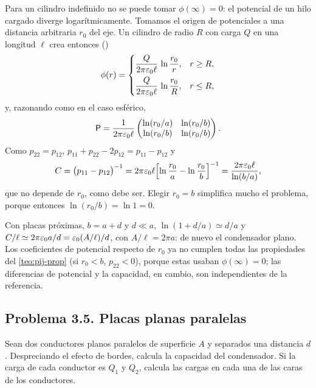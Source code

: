\begin{resolucion}
 Para un cilindro indefinido no se puede tomar $\phi(\infty)=0$: el potencial de un hilo cargado diverge
logarítmicamente. Tomamos el origen de potenciales a una distancia arbitraria $r_0$ del eje. Un cilindro de radio $R$ con carga $Q$ en una longitud $\ell$
crea entonces ()
\[
  \phi(r)=\begin{cases}\dfrac{Q}{2\pi\varepsilon_{0}\ell}\,\ln\dfrac{r_0}{r}, & r\ge R,\\[8pt] \dfrac{Q}{2\pi\varepsilon_{0}\ell}\,\ln\dfrac{r_0}{R}, & r\le R,\end{cases}
\]
y, razonando como en el caso esférico,
\[
  \mathsf{P}=\frac{1}{2\pi\varepsilon_{0}\ell}\begin{pmatrix}\ln(r_0/a) & \ln(r_0/b)\\ \ln(r_0/b) & \ln(r_0/b)\end{pmatrix}.
\]
Como $p_{22}=p_{12}$, $p_{11}+p_{22}-2p_{12}=p_{11}-p_{12}$ y
\[
  C=\bigl(p_{11}-p_{12}\bigr)^{-1}=2\pi\varepsilon_{0}\ell\Bigl[\ln\frac{r_0}{a}-\ln\frac{r_0}{b}\Bigr]^{-1}=\frac{2\pi\varepsilon_{0}\ell}{\ln(b/a)} ,
\]
que no depende de $r_0$, como debe ser. Elegir $r_0=b$ simplifica mucho el problema, porque entonces $\ln(r_0/b)=\ln1=0$.
\end{resolucion}



\begin{observacion}[Interpretación]\label{obs:sem-cilindrico}
Con placas próximas, $b=a+d$ y $d\ll a$, $\ln(1+d/a)\simeq d/a$ y $C/\ell\simeq2\pi\varepsilon_{0} a/d=\varepsilon_{0}(A/\ell)/d$, con $A/\ell=2\pi a$: de nuevo el condensador plano. Los
coeficientes de potencial respecto de $r_0$ ya no cumplen todas las propiedades del \cref{teo:pij-prop} (si $r_0<b$, $p_{22}<0$), porque estas usaban
$\phi(\infty)=0$; las diferencias de potencial y la capacidad, en cambio, son independientes de la referencia.
\end{observacion}

\subsection{Problema 3.5. Placas planas paralelas}\label{sem:plano}
\begin{problema}\label{prob:plano}
Sean dos conductores planos paralelos de superficie $A$ y separados una distancia $d$. Despreciando el efecto de bordes, calcula la capacidad del
condensador. Si la carga de cada conductor es $Q_1$ y $Q_2$, calcula las cargas en cada una de las caras de los conductores.
\end{problema}

